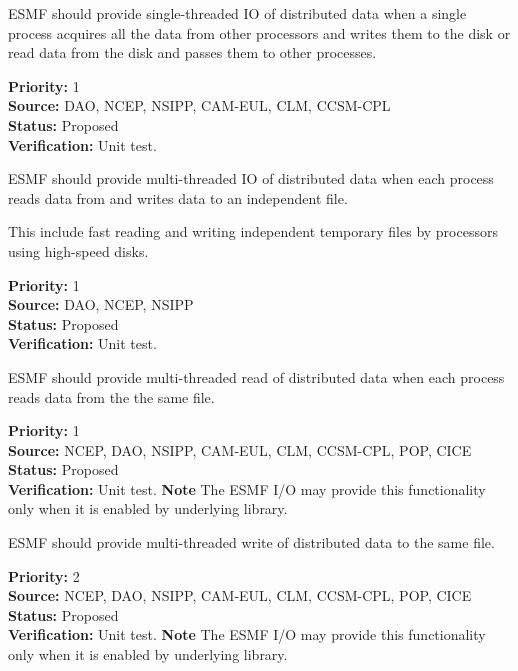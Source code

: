 


ESMF should provide single-threaded IO of distributed data when a
single process acquires all the data from other processors and writes
them to the disk or read data from the disk and passes them to other 
processes. 


\begin{reqlist}
{\bf Priority:} 1 \\
{\bf Source:} DAO, NCEP, NSIPP, CAM-EUL, CLM, CCSM-CPL \\
{\bf Status:} Proposed \\
{\bf Verification:} Unit test.
\end{reqlist}




ESMF should provide multi-threaded IO of distributed data when each
process reads data from and writes data to an independent file. 

This include fast reading and writing independent temporary files by 
processors using high-speed disks.

\begin{reqlist}
{\bf Priority:} 1 \\
{\bf Source:} DAO, NCEP, NSIPP \\
{\bf Status:} Proposed \\
{\bf Verification:} Unit test.
\end{reqlist}




ESMF should provide multi-threaded read of distributed data when each
process reads data from the the same file.  

\begin{reqlist}
{\bf Priority:} 1 \\
{\bf Source:} NCEP, DAO, NSIPP, CAM-EUL, CLM, CCSM-CPL, POP, CICE \\
{\bf Status:} Proposed \\
{\bf Verification:} Unit test.
{\bf Note} The ESMF I/O may provide this functionality only when it is 
enabled by underlying library. 
\end{reqlist}





ESMF should provide multi-threaded write of distributed data to the same 
file.  

\begin{reqlist}
{\bf Priority:} 2 \\
{\bf Source:} NCEP, DAO, NSIPP, CAM-EUL, CLM, CCSM-CPL, POP, CICE \\
{\bf Status:} Proposed \\
{\bf Verification:} Unit test.
{\bf Note} The ESMF I/O may provide this functionality only when it is 
enabled by underlying library. 
\end{reqlist}
